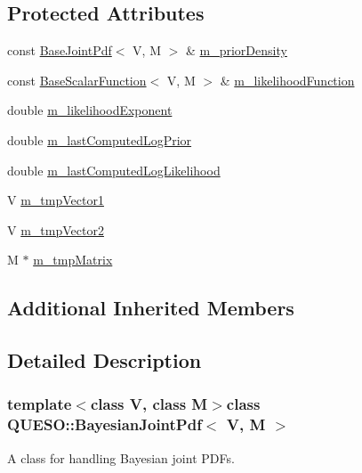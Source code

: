 \subsection*{Protected Attributes}
\begin{DoxyCompactItemize}
\item 
const \hyperlink{class_q_u_e_s_o_1_1_base_joint_pdf}{Base\-Joint\-Pdf}$<$ V, M $>$ \& \hyperlink{class_q_u_e_s_o_1_1_bayesian_joint_pdf_a3cafafe8c5ea2353eedaecee156f609a}{m\-\_\-prior\-Density}
\item 
const \hyperlink{class_q_u_e_s_o_1_1_base_scalar_function}{Base\-Scalar\-Function}$<$ V, M $>$ \& \hyperlink{class_q_u_e_s_o_1_1_bayesian_joint_pdf_a8e2506801de447f8acd187f8edfa330d}{m\-\_\-likelihood\-Function}
\item 
double \hyperlink{class_q_u_e_s_o_1_1_bayesian_joint_pdf_a511b1e403ebcab436177491ea8f21c07}{m\-\_\-likelihood\-Exponent}
\item 
double \hyperlink{class_q_u_e_s_o_1_1_bayesian_joint_pdf_a2b1c5582be60a876a6dd08766e7e31ed}{m\-\_\-last\-Computed\-Log\-Prior}
\item 
double \hyperlink{class_q_u_e_s_o_1_1_bayesian_joint_pdf_af97f3ff0d65154366e31d14fd88ccb38}{m\-\_\-last\-Computed\-Log\-Likelihood}
\item 
V \hyperlink{class_q_u_e_s_o_1_1_bayesian_joint_pdf_af4252d2628298423a60335eef72136c6}{m\-\_\-tmp\-Vector1}
\item 
V \hyperlink{class_q_u_e_s_o_1_1_bayesian_joint_pdf_a2c81721bddf0ffd5547751f1a8221a5d}{m\-\_\-tmp\-Vector2}
\item 
M $\ast$ \hyperlink{class_q_u_e_s_o_1_1_bayesian_joint_pdf_a686da1b57929c8b506a5e8fe8974603d}{m\-\_\-tmp\-Matrix}
\end{DoxyCompactItemize}
\subsection*{Additional Inherited Members}


\subsection{Detailed Description}
\subsubsection*{template$<$class V, class M$>$class Q\-U\-E\-S\-O\-::\-Bayesian\-Joint\-Pdf$<$ V, M $>$}

A class for handling Bayesian joint P\-D\-Fs. 

